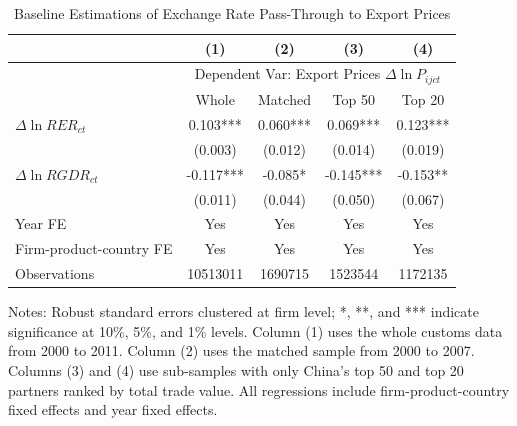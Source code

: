 \begin{table}[H]
	\centering
	\caption{Baseline Estimations of Exchange Rate Pass-Through to Export Prices}
	\begin{threeparttable}
		\begin{tabular}{lcccc}
			\toprule
			& (1)   & (2)   & (3)   & (4) \\
			\midrule
                & \multicolumn{4}{c}{Dependent Var: Export Prices $\Delta \ln P_{ijct}$} \\
			& Whole & Matched & Top 50 & Top 20 \\
			\midrule
			$\Delta \ln RER_{ct}$ & 0.103*** & 0.060*** & 0.069*** & 0.123*** \\
			& (0.003) & (0.012) & (0.014) & (0.019) \\
			$\Delta \ln RGDR_{ct}$ &  -0.117*** & -0.085* & -0.145*** & -0.153** \\
			& (0.011) & (0.044) & (0.050) & (0.067) \\
                \midrule
			Year FE  & Yes   & Yes   & Yes   & Yes \\
			Firm-product-country FE & Yes   & Yes   & Yes   & Yes \\
			Observations & 10513011 & 1690715 & 1523544 & 1172135 \\
			\bottomrule
		\end{tabular}
		\begin{tablenotes}
			\footnotesize
			\item Notes: Robust standard errors clustered at firm level;  *, **, and *** indicate significance at 10\%, 5\%, and 1\% levels. Column (1) uses the whole customs data from 2000 to 2011. Column (2) uses the matched sample from 2000 to 2007. Columns (3) and (4) use sub-samples with only China's top 50 and top 20 partners ranked by total trade value. All regressions include firm-product-country fixed effects and year fixed effects. 
		\end{tablenotes}
	\end{threeparttable}
	\label{tab.baseline.exp}
\end{table}

